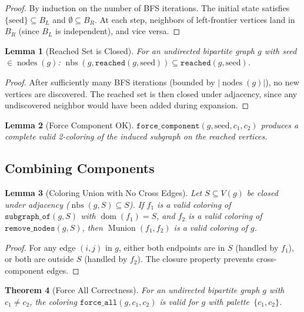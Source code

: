 \documentclass[11pt]{article}
\theoremstyle{plain}
\newtheorem{theorem}{Theorem}[section]
\newtheorem{lemma}[theorem]{Lemma}
\theoremstyle{definition}
\theoremstyle{remark}
\newcommand{\nodes}{\operatorname{nodes}}
\newcommand{\Mdomain}{\operatorname{dom}}
\newcommand{\Munion}{\operatorname{Munion}}
\newcommand{\nbs}{\operatorname{nbs}}
\begin{document}
\begin{proof}
By induction on the number of BFS iterations. The initial state satisfies $\{\text{seed}\} \subseteq B_L$ and $\emptyset \subseteq B_R$. At each step, neighbors of left-frontier vertices land in $B_R$ (since $B_L$ is independent), and vice versa.
\end{proof}

\begin{lemma}[Reached Set is Closed]
\label{lem:reached-closed}
For an undirected bipartite graph $g$ with seed $\in \nodes(g)$:
$\nbs(g, \texttt{reached}(g, \text{seed})) \subseteq \texttt{reached}(g, \text{seed})$.
\end{lemma}

\begin{proof}
After sufficiently many BFS iterations (bounded by $|\nodes(g)|$), no new vertices are discovered. The reached set is then closed under adjacency, since any undiscovered neighbor would have been added during expansion.
\end{proof}

\begin{lemma}[Force Component OK]
\label{lem:force-comp-ok}
$\texttt{force\_component}(g, \text{seed}, c_1, c_2)$ produces a complete valid 2-coloring of the induced subgraph on the reached vertices.
\end{lemma}

\subsection{Combining Components}

\begin{lemma}[Coloring Union with No Cross Edges]
\label{lem:col-union}
Let $S \subseteq V(g)$ be closed under adjacency ($\nbs(g, S) \subseteq S$). If $f_1$ is a valid coloring of $\texttt{subgraph\_of}(g, S)$ with $\Mdomain(f_1) = S$, and $f_2$ is a valid coloring of $\texttt{remove\_nodes}(g, S)$, then $\Munion(f_1, f_2)$ is a valid coloring of $g$.
\end{lemma}

\begin{proof}
For any edge $(i,j)$ in $g$, either both endpoints are in $S$ (handled by $f_1$), or both are outside $S$ (handled by $f_2$). The closure property prevents cross-component edges.
\end{proof}

\begin{theorem}[Force All Correctness]
\label{thm:force-all}
For an undirected bipartite graph $g$ with $c_1 \neq c_2$,
the coloring $\texttt{force\_all}(g, c_1, c_2)$ is valid for $g$ with palette~$\{c_1, c_2\}$.
\end{theorem}
\end{document}
